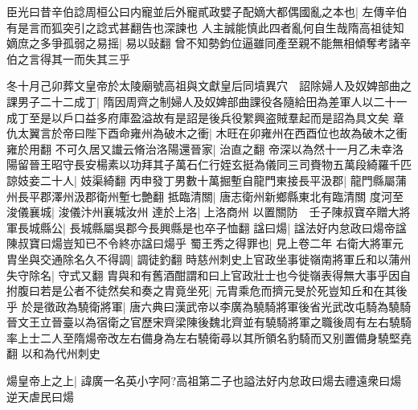 臣光曰昔辛伯諗周桓公曰内寵並后外寵貳政嬖子配嫡大都偶國亂之本也|{
	左傳辛伯有是言而狐突引之諗式甚翻告也深諫也}
人主誠能慎此四者亂何自生哉隋高祖徒知嫡庶之多爭孤弱之易摇|{
	易以䜴翻}
曾不知勢鈞位逼雖同產至親不能無相傾奪考諸辛伯之言得其一而失其三乎

冬十月己卯葬文皇帝於太陵廟號高祖與文獻皇后同墳異穴　詔除婦人及奴婢部曲之課男子二十二成丁|{
	隋因周齊之制婦人及奴婢部曲課役各隨給田為差軍人以二十一成丁至是以戶口益多府庫盈溢故有是詔是後兵役䌓興盗賊羣起而是詔為具文矣}
章仇太翼言於帝曰陛下酉命雍州為破木之衝|{
	木旺在卯雍州在西酉位也故為破木之衝雍於用翻}
不可久居又䜟云脩治洛陽還晉家|{
	治直之翻}
帝深以為然十一月乙未幸洛陽留晉王昭守長安楊素以功拜其子萬石仁行姪玄挺為儀同三司賚物五萬段綺羅千匹諒妓妾二十人|{
	妓渠綺翻}
丙申發丁男數十萬掘塹自龍門東接長平汲郡|{
	龍門縣屬蒲州長平郡澤州汲郡衛州塹七艶翻}
抵臨清關|{
	唐志衛州新鄉縣東北有臨清關}
度河至浚儀襄城|{
	浚儀汴州襄城汝州}
達於上洛|{
	上洛商州}
以置關防　壬子陳叔寶卒贈大將軍長城縣公|{
	長城縣屬吳郡今長興縣是也卒子恤翻}
諡曰煬|{
	諡法好内怠政曰煬帝諡陳叔寶曰煬豈知已不令終亦諡曰煬乎}
蜀王秀之得罪也|{
	見上卷二年}
右衛大將軍元胄坐與交通除名久不得調|{
	調徒釣翻}
時慈州刺史上官政坐事徙嶺南將軍丘和以蒲州失守除名|{
	守式又翻}
胄與和有舊酒酣謂和曰上官政壯士也今徙嶺表得無大事乎因自拊腹曰若是公者不徒然矣和奏之胄竟坐死|{
	元胄乘危而擠元旻於死豈知丘和在其後乎}
於是徵政為驍衛將軍|{
	唐六典曰漢武帝以李廣為驍騎將軍後省光武改屯騎為驍騎晉文王立晉臺以為宿衛之官歷宋齊梁陳後魏北齊並有驍騎將軍之職後周有左右驍騎率上士二人至隋煬帝改左右備身為左右驍衛尋以其所領名豹騎而又别置備身驍堅堯翻}
以和為代州刺史

煬皇帝上之上|{
	諱廣一名英小字阿?高祖第二子也謚法好内怠政曰煬去禮遠衆曰煬逆天虐民曰煬}


